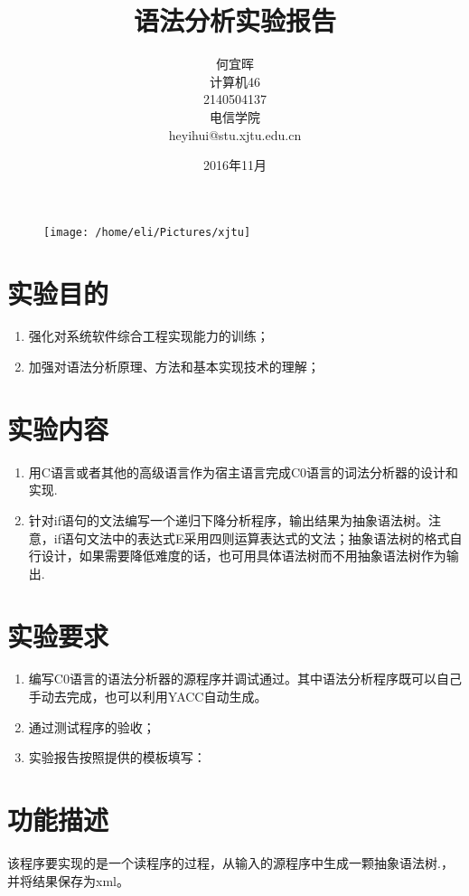 \documentclass{article}
\date{2016年11月}
\title{语法分析实验报告}
\author{何宜晖\\计算机46\\2140504137\\电信学院\\heyihui@stu.xjtu.edu.cn}
\begin{document}
\begin{CJK}{UTF8}{gkai}
\begin{figure}
\centering
\texttt{[image: /home/eli/Pictures/xjtu]}
\end{figure}


\maketitle
\clearpage
\section{实验目的}
\begin{enumerate}
	\item 强化对系统软件综合工程实现能力的训练；
	\item 加强对语法分析原理、方法和基本实现技术的理解；
\end{enumerate}

\section{实验内容}
\begin{enumerate}
	\item 用C语言或者其他的高级语言作为宿主语言完成C0语言的词法分析器的设计和实现.
	\item 针对if语句的文法编写一个递归下降分析程序，输出结果为抽象语法树。注意，if语句文法中的表达式E采用四则运算表达式的文法；抽象语法树的格式自行设计，如果需要降低难度的话，也可用具体语法树而不用抽象语法树作为输出.
\end{enumerate}

\section{实验要求}
\begin{enumerate}
\item 编写C0语言的语法分析器的源程序并调试通过。其中语法分析程序既可以自己手动去完成，也可以利用YACC自动生成。
\item 通过测试程序的验收； 
\item 实验报告按照提供的模板填写：
\end{enumerate}

\section{功能描述}
该程序要实现的是一个读程序的过程，从输入的源程序中生成一颗抽象语法树\cite{chen2000}\cite{appel2004modern}\cite{louden2000}\cite{appel2006}.，并将结果保存为xml。


\end{CJK}
\end{document}

